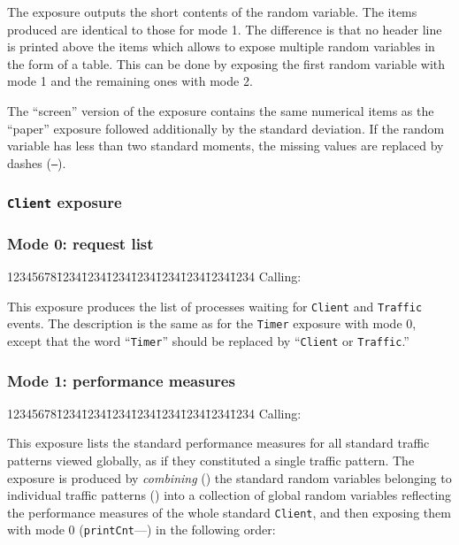 The exposure outputs the short
contents of the random variable.
The items produced are identical to those for mode 1.
The difference is that no header line is printed above the items which
allows to expose multiple random variables in the form of a table.
This can be done by exposing the first random variable with mode 1 and
the remaining ones with mode 2.

The ``screen'' version of the exposure contains the same numerical items as the
``paper'' exposure followed additionally by the standard deviation.
If the random variable has less than two standard moments, the missing
values are replaced by dashes ({\tt ---}).

\subsubsection{{\tt Client} exposure}
\label{rm_ex_se_cl}

\subsubsection*{Mode 0: request list}

{\tt\begin{tabbing}
12345678\=1234\=1234\=1234\=1234\=1234\=1234\=1234\=1234\kill
{\rm Calling:}
\end{tabbing}}

This exposure produces
the list of processes waiting for {\tt Client} and {\tt Traffic} events.
The description is the same as for the {\tt Timer} exposure
with mode 0, except that the word ``{\tt Timer}'' should be replaced by
``{\tt Client} or {\tt Traffic}.''

\subsubsection*{Mode 1: performance measures}

{\tt\begin{tabbing}
12345678\=1234\=1234\=1234\=1234\=1234\=1234\=1234\=1234\kill
{\rm Calling:}
\end{tabbing}}

This exposure lists the standard performance measures for all standard
traffic patterns viewed globally, as if they constituted a single traffic
pattern.
The exposure is produced by {\em combining\/} () the
standard random variables belonging to individual traffic patterns
() into
a collection of global random variables reflecting the performance measures
of the whole standard {\tt Client}, and then exposing them with mode 0
({\tt printCnt}---) in the following order:

